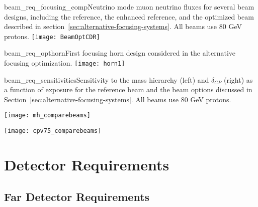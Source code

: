 \begin{cdrfigure}
{beam_req_focusing_comp}{Neutrino mode muon 
    neutrino fluxes for several beam designs, including the 
    reference, the enhanced reference, and the optimized beam
    described in section~\ref{sec:alternative-focusing-systems}.  All
    beams use 80 GeV protons.}
  \texttt{[image: BeamOptCDR]}
\end{cdrfigure}

\begin{cdrfigure}{beam_req_opthorn}{First focusing horn design considered 
    in the alternative focusing optimization. 
}
  \texttt{[image: horn1]}
\end{cdrfigure}

\begin{cdrfigure}
{beam_req_sensitivities}{Sensitivity to the mass hierarchy (left) and
  $\delta_{CP}$ (right) as a function of exposure for the reference beam and
  the beam options discussed in
  Section~\ref{sec:alternative-focusing-systems}.  All beams use 80
  GeV protons.}

\centering 
\begin{minipage}{0.5\textwidth}
\centering 
\texttt{[image: mh\_comparebeams]}
\end{minipage}\hfill 
\begin{minipage}{0.5\textwidth}
\centering 
\texttt{[image: cpv75\_comparebeams]}
\end{minipage} 
\end{cdrfigure}

\section{Detector Requirements}
\label{sec:physics-lbnosc-det-req}

\subsection{Far Detector Requirements}
\label{sec:physics-lbnosc-fd-req}

